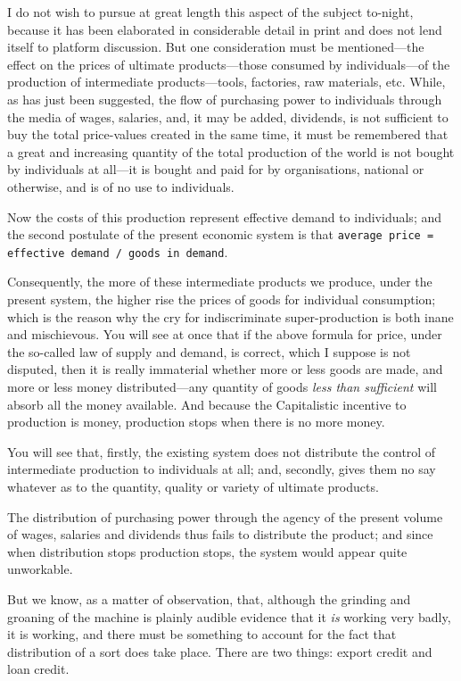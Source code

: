 \documentclass{book}
\newcommand\mdcode[1]{\texttt{#1}}
\begin{document}
I do not wish to pursue at great length this aspect of the subject to-night, because it has been elaborated in considerable detail in print and does not lend itself to platform discussion. But one consideration must be mentioned—the effect on the prices of ultimate products—those consumed by individuals—of the production of intermediate products—tools, factories, raw materials, etc. While, as has just been suggested, the flow of purchasing power to individuals through the media of wages, salaries, and, it may be added, dividends, is not sufficient to buy the total price-values created in the same time, it must be remembered that a great and increasing quantity of the total production of the world is not bought by individuals at all—it is bought and paid for by organisations, national or otherwise, and is of no use to individuals.

Now the costs of this production represent effective demand to individuals; and the second postulate of the present economic system is that \mdcode{average price = effective demand /\allowbreak{} goods in demand}.

Consequently, the more of these intermediate products we produce, under the present system, the higher rise the prices of goods for individual consumption; which is the reason why the cry for indiscriminate super-production is both inane and mischievous. You will see at once that if the above formula for price, under the so-called law of supply and demand, is correct, which I suppose is not disputed, then it is really immaterial whether more or less goods are made, and more or less money distributed—any quantity of goods \emph{less than sufficient} will absorb all the money available. And because the Capitalistic incentive to production is money, production stops when there is no more money.

You will see that, firstly, the existing system does not distribute the control of intermediate production to individuals at all; and, secondly, gives them no say whatever as to the quantity, quality or variety of ultimate products.

The distribution of purchasing power through the agency of the present volume of wages, salaries and dividends thus fails to distribute the product; and since when distribution stops production stops, the system would appear quite unworkable.

But we know, as a matter of observation, that, although the grinding and groaning of the machine is plainly audible evidence that it \emph{is} working very badly, it is working, and there must be something to account for the fact that distribution of a sort does take place. There are two things: export credit and loan credit.
\end{document}
